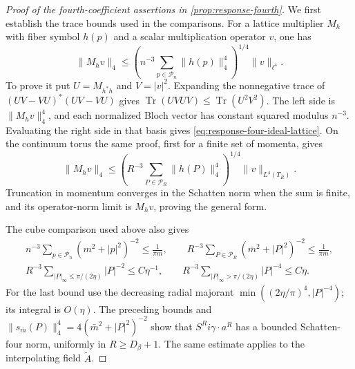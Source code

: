 \begin{proof}[Proof of the fourth-coefficient assertions in \cref{prop:response-fourth}]
We first establish the trace bounds used in the comparisons.
For a lattice multiplier $M_h$ with fiber symbol $h(p)$
and a scalar multiplication operator $v$, one has
\begin{equation}\label{eq:response-four-ideal-lattice}
 \|M_hv\|_4\le
       \left(n^{-3}\sum_{p\in\mathcal P_n}\|h(p)\|_4^4\right)^{1/4}
                                         \|v\|_{\ell^4}.
\end{equation}
To prove it put $U=M_{h^*h}$ and $V=|v|^2$. Expanding the
nonnegative trace of $(UV-VU)^*(UV-VU)$ gives
$\operatorname{Tr}(UVUV)\le\operatorname{Tr}(U^2V^2)$.
The left side is $\|M_hv\|_4^4$, and each normalized
Bloch vector has constant squared modulus $n^{-3}$.
Evaluating the right side in that basis gives
\eqref{eq:response-four-ideal-lattice}. On the continuum
torus the same proof, first for a finite set of momenta,
gives
\begin{equation}\label{eq:response-four-ideal-torus}
 \|M_hv\|_4\le
       \left(R^{-3}\sum_{P\in\mathcal P_R}\|h(P)\|_4^4\right)^{1/4}
                                           \|v\|_{L^4(T_R)}.
\end{equation}
Truncation in momentum converges in the Schatten norm
when the sum is finite, and its operator-norm limit is
$M_hv$, proving the general form.

The cube comparison used above also gives
\begin{equation}\label{eq:response-four-momentum-sums}
 \begin{gathered}
 n^{-3}\sum_{p\in\mathcal P_n}(m^2+|p|^2)^{-2}\le\frac1{\pi m},
 \qquad
 R^{-3}\sum_{P\in\mathcal P_R}(\bar m^2+|P|^2)^{-2}
                                             \le\frac1{\pi\bar m},\\
 R^{-3}\sum_{|P|_\infty\le\pi/(2\eta)}|P|^{-2}\le C\eta^{-1},
 \qquad
 R^{-3}\sum_{|P|_\infty>\pi/(2\eta)}|P|^{-4}\le C\eta.
 \end{gathered}
\end{equation}
For the last bound use the decreasing radial majorant
$\min((2\eta/\pi)^4,|P|^{-4})$; its integral is $O(\eta)$.
The preceding bounds and
$\|s_{\bar m}(P)\|_4^4=4(\bar m^2+|P|^2)^{-2}$ show that
$S^Ri\gamma\cdot a^R$ has a bounded Schatten-four norm,
uniformly in $R\ge D_\beta+1$. The same estimate applies
to the interpolating field $\widetilde A$.


\end{proof}
